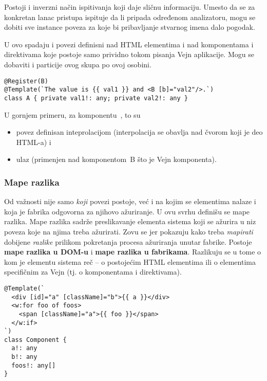 Postoji i inverzni način ispitivanja koji daje sličnu informaciju.
Umesto da se za konkretan lanac pristupa ispituje da li pripada određenom analizatoru, mogu se dobiti sve instance poveza za koje bi pribavljanje stvarnog imena dalo pogodak.

U ovo spadaju i povezi definisni nad  HTML elementima i nad komponentama i direktivama koje postoje samo prividno tokom pisanja Vejn aplikacije.
Mogu se dobaviti i particije ovog skupa po ovoj osobini.

\begin{lstlisting}
@Register(B)
@Template(`The value is {{ val1 }} and <B [b]="val2"/>.`)
class A { private val1!: any; private val2!: any }
\end{lstlisting}

U gornjem primeru, za komponentu~, to su

\begin{itemize}
  \item povez definisan inteprolacijom  (interpolacija se obavlja nad  čvorom koji je deo HTML-a) i
  \item ulaz \code{ba]="val2"} (primenjen nad komponentom~\code B što je Vejn komponenta).
\end{itemize}

\subsubsection{Mape razlika}\label{sec:getDomDiffMap}\label{sec:getFaDiffMap}

Od važnosti nije samo \emph{koji} povezi postoje, već i na kojim se elementima nalaze i koja je fabrika odgovorna za njihovo ažuriranje.
U ovu svrhu definišu se mape razlika.
Mape razlika sadrže preslikavanje elementa sistema koji se ažurira u niz poveza koje na njima treba ažurirati.
Zovu se  jer pokazuju kako treba \emph{mapirati} dobijene \emph{razlike} prilikom pokretanja procesa ažuriranja unutar fabrike.
Postoje \textbf{mape razlika u DOM-u} i \textbf{mape razlika u fabrikama}.
Razlikuju se u tome o kom je elementu sistema reč -- o postojećim HTML elementima ili o elementima specifičnim za Vejn (tj. o komponentama i direktivama).

\begin{lstlisting}
@Template(`
  <div [id]="a" [className]="b">{{ a }}</div>
  <w:for foo of foos>
    <span [className]="a">{{ foo }}</span>
  </w:if>
`)
class Component {
  a!: any
  b!: any
  foos!: any[]
}
\end{lstlisting}

